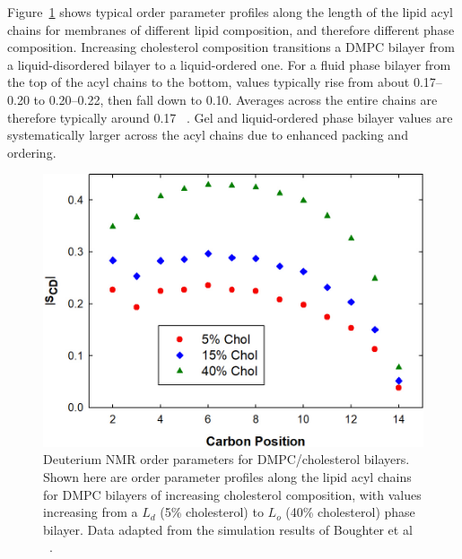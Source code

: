 \documentclass[9pt,bestpractices,pubversion]{livecoms}
\begin{document}
Figure~\ref{fig:scd} shows typical order parameter profiles along the length of the lipid acyl chains for membranes of different lipid composition, and therefore different phase composition.
Increasing cholesterol composition transitions a DMPC bilayer from a liquid-disordered bilayer to a liquid-ordered one.
For a fluid phase bilayer from the top of the acyl chains to the bottom, values typically rise from about 0.17--0.20 to 0.20--0.22, then fall down to 0.10.
Averages across the entire chains are therefore typically around 0.17 ~\cite{Venable2015}.
Gel and liquid-ordered phase bilayer values are systematically larger across the acyl chains due to enhanced packing and ordering.

\begin{figure}
\centering
\begin{minipage}[c]{\columnwidth}
\centering
	\includegraphics[width=\columnwidth]{figures/scd.jpg}
	\caption{Deuterium NMR order parameters for DMPC/cholesterol bilayers. Shown here are order parameter profiles along the lipid acyl chains for DMPC bilayers of increasing cholesterol composition, with values increasing from a $L_d$ (5\% cholesterol) to $L_o$ (40\% cholesterol) phase bilayer. Data adapted from the simulation results of Boughter et al ~\cite{Boughter2016}.}
	\label{fig:scd}
\end{minipage}
\end{figure}
\end{document}
